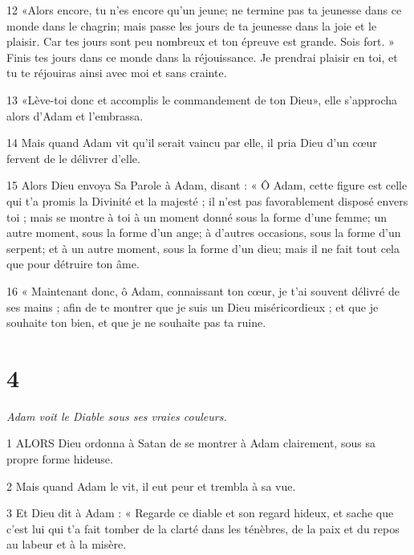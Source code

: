 \par 12 «Alors encore, tu n'es encore qu'un jeune; ne termine pas ta jeunesse dans ce monde dans le chagrin; mais passe les jours de ta jeunesse dans la joie et le plaisir. Car tes jours sont peu nombreux et ton épreuve est grande. Sois fort. » Finis tes jours dans ce monde dans la réjouissance. Je prendrai plaisir en toi, et tu te réjouiras ainsi avec moi et sans crainte.

\par 13 «Lève-toi donc et accomplis le commandement de ton Dieu», elle s'approcha alors d'Adam et l'embrassa.

\par 14 Mais quand Adam vit qu'il serait vaincu par elle, il pria Dieu d'un cœur fervent de le délivrer d'elle.

\par 15 Alors Dieu envoya Sa Parole à Adam, disant : « Ô Adam, cette figure est celle qui t'a promis la Divinité et la majesté ; il n'est pas favorablement disposé envers toi ; mais se montre à toi à un moment donné sous la forme d'une femme; un autre moment, sous la forme d'un ange; à d'autres occasions, sous la forme d'un serpent; et à un autre moment, sous la forme d'un dieu; mais il ne fait tout cela que pour détruire ton âme.

\par 16 « Maintenant donc, ô Adam, connaissant ton cœur, je t'ai souvent délivré de ses mains ; afin de te montrer que je suis un Dieu miséricordieux ; et que je souhaite ton bien, et que je ne souhaite pas ta ruine.

\chapter{4}

\par \textit{Adam voit le Diable sous ses vraies couleurs.}

\par 1 ALORS Dieu ordonna à Satan de se montrer à Adam clairement, sous sa propre forme hideuse.

\par 2 Mais quand Adam le vit, il eut peur et trembla à sa vue.

\par 3 Et Dieu dit à Adam : « Regarde ce diable et son regard hideux, et sache que c'est lui qui t'a fait tomber de la clarté dans les ténèbres, de la paix et du repos au labeur et à la misère.


